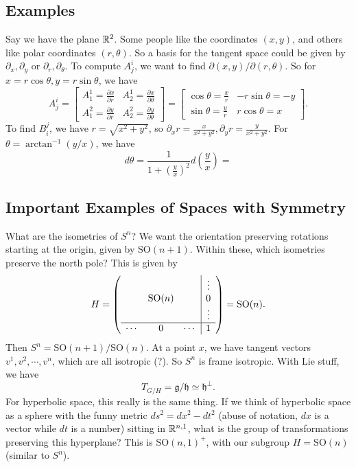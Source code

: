 \subsection{Examples}
Say we have the plane $\mathbb{R}^2$. Some people like the coordinates $(x,y)$, and others like polar coordinates $(r,\theta)$. So a basis for the tangent space could be given by $\partial _x, \partial _y$ or $\partial _r, \partial _{\theta}$. To compute $A_j ^i $, we want to find $\partial (x,y) / \partial (r, \theta)$. So for $x=r \cos \theta, y=r \sin \theta$, we have 
\[
A^i _j =
\begin{bmatrix}
    A_1^1=\frac{\partial x}{\partial r}& A_2^1= \frac{\partial x}{\partial \theta}\\
    A_1^2= \frac{\partial y}{\partial r} & A_2^2=\frac{\partial y}{\partial \theta}
\end{bmatrix}=
\begin{bmatrix}
    \cos \theta=\frac{x}{r} & -r \sin \theta=-y \\
    \sin \theta= \frac{y}{r}& r \cos \theta=x
\end{bmatrix}.
\] To find $B^j _i $, we have $r=\sqrt{x^2+y^2} $,  so $\partial_x r= \frac{x}{x^2+y^2}, \partial _y r=\frac{y}{x^2+y^2}$. For $\theta= \arctan^{-1}(y /x)$, we have \[
d\theta = \frac{1}{1+\left( \frac{y}{x} \right) ^2}d\left( \frac{y}{x} \right) =
\] 
\subsection{Important Examples of Spaces with Symmetry}
What are the isometries of $S^n $? We want the orientation preserving rotations starting at the origin, given by $\mathrm{SO}(n+1)$. Within these, which isometries preserve the north pole? This is given by  \[
H= 
\mleft(\begin{array}{ccc|c}
    & & & \vdots \\
    & \mathrm{SO}(n) & &0\\
    & & & \vdots\\
    \hline
    \cdots &0&\cdots & 1
\end{array}\mright)= \mathrm {SO}(n).
\] Then $S^n = \mathrm{SO}(n+1) / \mathrm{SO}(n)$. At a point $x$, we have tangent vectors $v^1, v^2, \cdots ,v^n $, which are all isotropic (?). So $S^n $ is frame isotropic. With Lie stuff, we have \[
T_{G /H}=\mathfrak g / \mathfrak h \simeq \mathfrak h ^{\perp}.
\] For hyperbolic space, this really is the same thing. If we think of hyperbolic space as a sphere with the funny metric $ds ^2= dx^2 -dt^2$ (abuse of notation, $dx$ is a vector while $dt$ is a number) sitting in $\mathbb{R}^{n,1}$, what is the group of transformations preserving this hyperplane? This is $\mathrm{SO}(n,1)^+$, with our subgroup $H=\mathrm{SO}(n)$ (similar to $S^n $). 

